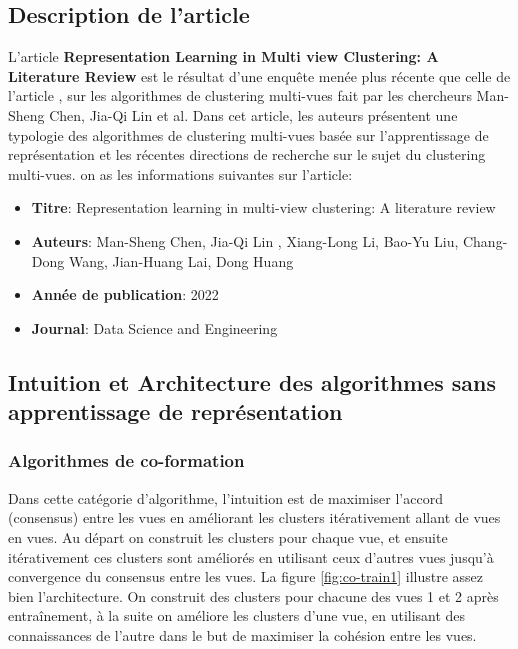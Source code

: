 \documentclass[12pt, french, latin.medieval, a4paper]{report}
\begin{document}
    	\subsection{Description de l'article}
        	L'article \textbf{Representation Learning in Multi view Clustering: A Literature Review} \cite{chen2022representation} est le résultat d'une enquête menée plus récente que celle de l'article \cite{yang2018multi}, sur les algorithmes de clustering multi-vues fait par les chercheurs Man-Sheng Chen, Jia-Qi Lin et al. Dans cet article, les auteurs présentent une typologie des algorithmes de clustering multi-vues basée sur l'apprentissage de représentation et les récentes directions de recherche sur le sujet du clustering multi-vues. on as les informations suivantes sur l’article:
        	\begin{itemize}
            	\item \textbf{Titre}: Representation learning in multi-view clustering: A literature review
            	\item \textbf{Auteurs}:  Man-Sheng Chen, Jia-Qi Lin , Xiang-Long Li, Bao-Yu Liu, Chang-Dong Wang, Jian-Huang Lai, Dong Huang
            	\item \textbf{Année de publication}: 2022
            	\item \textbf{Journal}: Data Science and Engineering
        	\end{itemize}
   	 
    	\subsection{Intuition et Architecture des algorithmes sans apprentissage de représentation}
        	\subsubsection{Algorithmes de co-formation}
        	Dans cette catégorie d'algorithme, l'intuition est de maximiser l'accord (consensus) entre les vues en améliorant les clusters itérativement allant de vues en vues.
        	Au départ on construit les clusters pour chaque vue, et ensuite itérativement ces clusters sont améliorés en utilisant ceux d'autres vues jusqu'à convergence du consensus entre les vues.
        	La figure \ref{fig:co-train1} illustre assez bien l'architecture. On construit des clusters pour chacune des vues 1 et 2 après entraînement, à la suite on améliore les clusters d'une vue,
        	en utilisant des connaissances de l'autre dans le but de maximiser la cohésion entre les vues.
       	 
\end{document}
